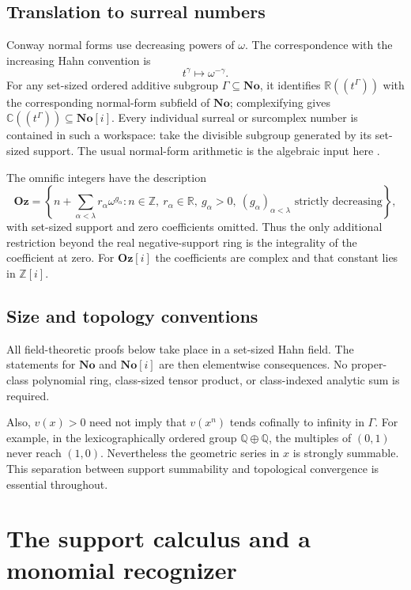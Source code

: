 \documentclass[11pt,letterpaper]{article}
\numberwithin{equation}{section}
\theoremstyle{definition}
\theoremstyle{remark}
\newcommand{\No}{\mathbf{No}}
\newcommand{\Oz}{\mathbf{Oz}}
\newcommand{\SC}{\mathbf{No}[i]}
\newcommand{\Goz}{\mathbf{Oz}[i]}
\newcommand{\C}{\mathbb C}
\newcommand{\R}{\mathbb R}
\newcommand{\Q}{\mathbb Q}
\newcommand{\Z}{\mathbb Z}
\begin{document}
\subsection{Translation to surreal numbers}

Conway normal forms use decreasing powers of $\omega$. The correspondence
with the increasing Hahn convention is
\begin{equation}\label{adr:eq:omega-bridge}
 t^\gamma\longmapsto\omega^{-\gamma}.
\end{equation}
For any set-sized ordered additive subgroup $\Gamma\subseteq\No$, it
identifies $\R((t^\Gamma))$ with the corresponding normal-form subfield
of $\No$; complexifying gives $\C((t^\Gamma))\subseteq\SC$.
Every individual surreal or surcomplex number is contained in such a
workspace: take the divisible subgroup generated by its set-sized support.
The usual normal-form arithmetic is the algebraic input here
\cite{LM,Repo}.

The omnific integers have the description
\begin{equation}\label{adr:eq:Oz}
 \Oz=\left\{n+\sum_{\alpha<\lambda}r_\alpha\omega^{g_\alpha}:
 n\in\Z,\ r_\alpha\in\R,\ g_\alpha>0,
 \ (g_\alpha)_{\alpha<\lambda}\text{ strictly decreasing}\right\},
\end{equation}
with set-sized support and zero coefficients omitted. Thus the only
additional restriction beyond the real negative-support ring is the
integrality of the coefficient at zero. For $\Goz$ the coefficients are
complex and that constant lies in $\Z[i]$.

\subsection{Size and topology conventions}

All field-theoretic proofs below take place in a set-sized Hahn field.
The statements for $\No$ and $\SC$ are then elementwise consequences.
No proper-class polynomial ring, class-sized tensor product, or
class-indexed analytic sum is required.

Also, $v(x)>0$ need not imply that $v(x^n)$ tends cofinally to infinity
in $\Gamma$. For example, in the lexicographically ordered group
$\Q\oplus\Q$, the multiples of $(0,1)$ never reach $(1,0)$.
Nevertheless the geometric series in $x$ is strongly summable. This
separation between support summability and topological convergence is
essential throughout.

\section{The support calculus and a monomial recognizer}
\label{adr:sec:support}
\end{document}
